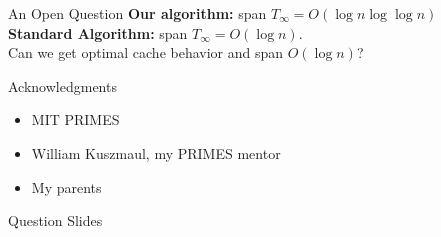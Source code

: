 \documentclass[xcolor=x11names, svgnames, rgb]{beamer}
\newcommand{\polylog}{\operatorname{polylog}}
\begin{document}


\begin{frame}[t]{An Open Question}
	\vspace{0.5cm}
	\textbf{Our algorithm:} span $T_\infty = O(\log n \log\log n)$\\
	\vspace{0.5cm}
	\textbf{Standard Algorithm:} span $T_\infty = O(\log n)$.\\
	\vspace{1cm}
	Can we get optimal cache behavior and span $O(\log n)$?
\end{frame}

\begin{frame}[t]{Acknowledgments}
\begin{itemize}
	\item {MIT PRIMES}
	\item {William Kuszmaul, my PRIMES mentor}
	\item {My parents}
\end{itemize}
\end{frame}


\begin{frame}[t]{}
	\vfill
	\begin{center}
		{\Huge Question Slides}
	\end{center}
	\vfill
\end{frame}
\end{document}
